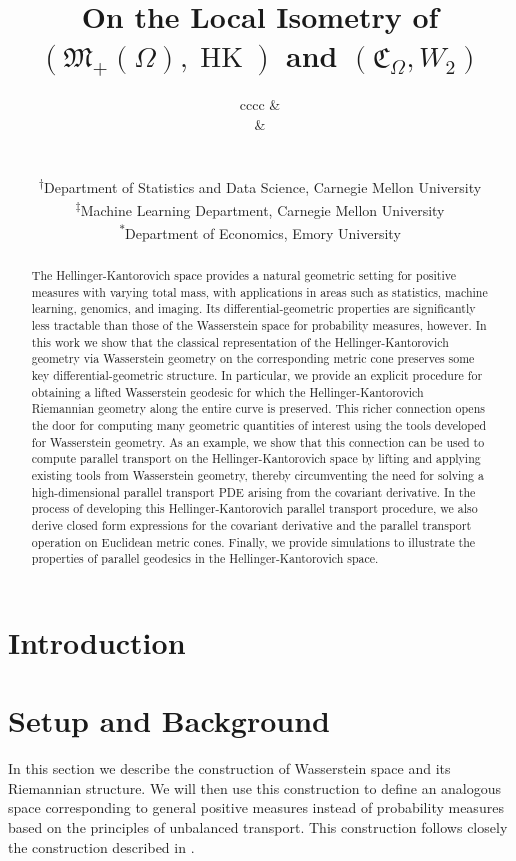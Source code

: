 \documentclass[11pt]{article}
\title{On the Local Isometry of $(\mathfrak{M}_+(\Omega), \operatorname{HK})$ and $(\mathfrak{C}_\Omega, W_2)$}
\author{
\begin{tabular}{cccc} %
\multicolumn{2}{c}{\makecell[c]{Tristan Luca Saidi\textsuperscript{\(\dagger\)}\\ \href{mailto:tsaidi@andrew.cmu.edu}{\nolinkurl{tsaidi@andrew.cmu.edu}}}} &
\multicolumn{2}{c}{\makecell[c]{Gonzalo Mena\textsuperscript{\(\dagger\)}\\ \href{mailto:gmena@andrew.cmu.edu}{\nolinkurl{gmena@andrew.cmu.edu}}}} \\[2em]
\multicolumn{2}{c}{\makecell[c]{Larry Wasserman\textsuperscript{\(\dagger, \ddagger\)}\\ \href{mailto:larry@stat.cmu.edu}{\nolinkurl{larry@stat.cmu.edu}}}} &
\multicolumn{2}{c}{\makecell[c]{Florian Gunsilius\textsuperscript{\(*\)}\\ \href{mailto:florian.felix.gunsilius@emory.edu}{\nolinkurl{fgunsil@emory.edu}}}} \\[1.5em]
\end{tabular}
\small\\ %
\textsuperscript{\(\dagger\)}Department of Statistics and Data Science, Carnegie Mellon University\\
\textsuperscript{\(\ddagger\)}Machine Learning Department, Carnegie Mellon University\\
\textsuperscript{\(*\)}Department of Economics, Emory University
}
\begin{document}
\maketitle


\begin{abstract}
    The Hellinger-Kantorovich space provides a natural geometric setting for positive measures with varying total mass, with applications in areas such as statistics, machine learning, genomics, and imaging. Its differential-geometric properties are significantly less tractable than those of the Wasserstein space for probability measures, however. In this work we show that the classical representation of the Hellinger-Kantorovich geometry via Wasserstein geometry on the corresponding metric cone preserves some key differential-geometric structure. In particular, we provide an explicit procedure for obtaining a lifted Wasserstein geodesic for which the Hellinger-Kantorovich Riemannian geometry along the entire curve is preserved. This richer connection opens the door for computing many geometric quantities of interest using the tools developed for Wasserstein geometry. As an example, we show that this connection can be used to compute parallel transport on the Hellinger-Kantorovich space by lifting and applying existing tools from Wasserstein geometry, thereby circumventing the need for solving a high-dimensional parallel transport PDE arising from the covariant derivative. In the process of developing this Hellinger-Kantorovich parallel transport procedure, we also derive closed form expressions for the covariant derivative and the parallel transport operation on Euclidean metric cones. Finally, we provide simulations to illustrate the properties of parallel geodesics in the Hellinger-Kantorovich space.
\end{abstract}





\section{Introduction}


\section{Setup and Background}

In this section we describe the construction of Wasserstein space and its Riemannian structure.  We will then use this construction to define an analogous space corresponding to general positive measures instead of probability measures based on the principles of unbalanced transport. This construction follows closely the construction described in \cite{clancy2021interpolating, chewi2024statisticaloptimaltransport, liero2018optimal, liero2016optimal, chizat2018interpolating, kondratyev2016newoptimaltransportdistance}. 
\end{document}
